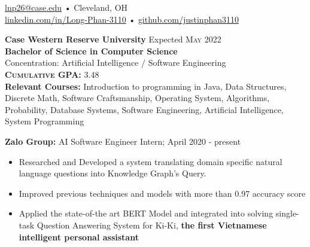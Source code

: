 \documentclass[a4paper,11pt]{article}
\begin{document}
 
 
\begin{center} 
\href{mailto:lnp26@case.edu}{lnp26@case.edu} • Cleveland, OH \\
\href{https://linkedin.com/in/Long-Phan-3110/}{linkedin.com/in/Long-Phan-3110} • \href{http://github.com/justinphan3110}{github.com/justinphan3110}
\noindent\makebox[\linewidth]{\rule{\paperwidth}{2pt}}
\end{center}

\begin{flushleft}
	\textbf{Case Western Reserve University } \hspace{1cm} Expected \textsc{May} 2022 \\
	\textbf{Bachelor of Science in Computer Science} \\
	Concentration: Artificial Intelligence / Software Engineering \\
	\textbf{\textsc{Cumulative GPA:}} 3.48 \\
    \textbf{Relevant Courses:}  Introduction to programming in Java, Data Structures, Discrete Math, Software Craftsmanship, Operating System, Algorithms, Probability, Database Systems,  Software Engineering, Artificial Intelligence, System Programming
    		
	\centering{\noindent\makebox{\rule{8cm}{1.5pt}}}
\end{flushleft}


\begin{flushleft}
	
	\textbf{Zalo Group: } AI Software Engineer Intern; April 2020 - present \\
	\vspace{-\topsep}
	\begin{itemize}
		\setlength{\parskip}{2pt}
		\setlength{\itemsep}{0pt plus 1pt}
		\item Researched and Developed a system translating domain specific natural language questions into Knowledge Graph's Query.
		\item Improved previous techniques and models with more than 0.97 accuracy score
		\item Applied the state-of-the art BERT Model and integrated into solving single-task Question Answering System for Ki-Ki, \textbf{the first Vietnamese intelligent personal assistant} 
	\end{itemize}
	\vspace{-\topsep}

\end{flushleft} 
\end{document}

